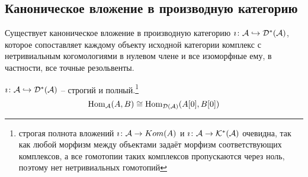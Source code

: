 \documentclass[../main.tex]{subfiles}
\begin{document}
\subsection{Каноническое вложение в производную категорию}
Существует каноническое вложение в производную категорию $\mathbf{\imath} \colon \mathcal{A} \hookrightarrow \mathcal{D^{*}(A)}$, которое сопоставляет каждому объекту исходной категории комплекс с нетривиальным когомологиями в нулевом члене и все изоморфные ему, в частности, все точные резольвенты. 
\begin{to_claim}
\label{full_i}
$\mathbf{\imath} \colon \mathcal{A} \hookrightarrow \mathcal{D^{*}(A)}$ -- строгий и полный.\footnote{строгая полнота вложений $\mathbf{\imath}\colon \mathcal{A} \to Kom(A)$ и $\mathbf{\imath}\colon \mathcal{A} \to \mathcal{K^{*}(A)}$ очевидна, так как любой морфизм между объектами задаёт морфизм соответствующих комплексов, а все гомотопии таких комплексов пропускаются через ноль, поэтому нет нетривиальных гомотопий}
\[
\operatorname{Hom}_{\mathcal{A}}(A, B) \cong \operatorname{Hom}_{\mathcal{D(A)}}(A[0], B[0])
\]
\end{to_claim}
\end{document}
